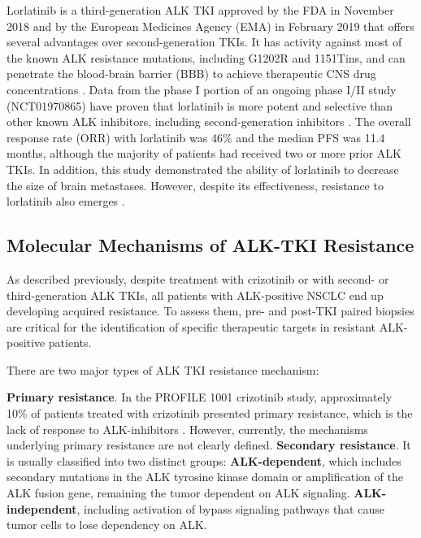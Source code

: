 Lorlatinib is a third-generation ALK TKI approved by the FDA in November 2018 and by the European Medicines Agency (EMA) in February 2019 that offers several advantages over second-generation TKIs. It has activity against most of the known ALK resistance mutations, including G1202R and 1151Tins, and can penetrate the blood-brain barrier (BBB) to achieve therapeutic CNS drug concentrations \cite{ALK_resistance, ALK_inhibitors, ALK_types_resistance}. Data from the phase I portion of an ongoing phase I/II study (NCT01970865) have proven that lorlatinib is more potent and selective than other known ALK inhibitors, including second-generation inhibitors \cite{Lorlatinib}. The overall response rate (ORR) with lorlatinib was 46\% and the median PFS was 11.4 months, although the majority of patients had received two or more prior ALK TKIs. In addition, this study demonstrated the ability of lorlatinib to decrease the size of brain metastases. However, despite its effectiveness, resistance to lorlatinib also emerges \cite{Lorlatinib_resistance}.

\subsection{Molecular Mechanisms of ALK-TKI Resistance}

As described previously, despite treatment with crizotinib or with second- or third-generation ALK TKIs, all patients with ALK-positive NSCLC end up developing acquired resistance. To assess them, pre- and post-TKI paired biopsies are critical for the identification of specific therapeutic targets in resistant ALK-positive patients.

There are two major types of ALK TKI resistance mechanism:
\begin{outline}
    \1 \textbf{Primary resistance}. In the PROFILE 1001 crizotinib study, approximately 10\% of patients treated with crizotinib presented primary resistance, which is the lack of response to ALK-inhibitors \cite{Crizotinib_1_2}. However, currently, the mechanisms underlying primary resistance are not clearly defined.
    \1 \textbf{Secondary resistance}. It is usually classified into two distinct groups:
        \2 \textbf{ALK-dependent}, which includes secondary mutations in the ALK tyrosine kinase domain or amplification of the ALK fusion gene, remaining the tumor dependent on ALK signaling.
        \2 \textbf{ALK-independent}, including activation of bypass signaling pathways that cause tumor cells to lose dependency on ALK.
\end{outline}

